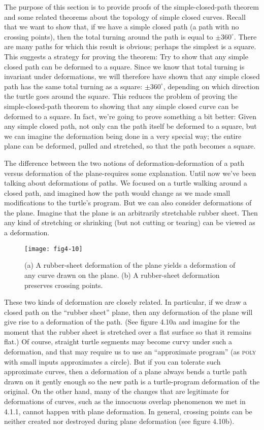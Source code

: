 \documentclass{book}
\begin{document}
The purpose of this section is to provide proofs of the simple-closed-path
theorem and some related theorems about the topology of simple closed
curves. Recall that we want to show that, if we have a simple closed
path (a path with no crossing points), then the total turning around the
path is equal to $\pm 360^{\circ}$. There are many paths for which this result
is obvious; perhaps the simplest is a square. This suggests a strategy
for proving the theorem: Try to show that any simple closed path can
be deformed to a square. Since we know that total turning is invariant
under deformations, we will therefore have shown that any simple closed
path has the same total turning as a square: $\pm 360^{\circ}$, depending on which
direction the turtle goes around the square. This reduces the problem
of proving the simple-closed-path theorem to showing that any simple
closed curve can be deformed to a square. In fact, we're going to prove
something a bit better: Given any simple closed path, not only can the
path itself be deformed to a square, but we can imagine the deformation
being done in a very special way; the entire plane can be deformed,
pulled and stretched, so that the path becomes a square.

The difference between the two notions of deformation-deformation
of a path versus deformation of the plane-requires some explanation.
Until now we've been talking about deformations of paths. We focused
on a turtle walking around a closed path, and imagined how the path
would change as we made small modifications to the turtle's program.
But we can also consider deformations of the plane. Imagine that the
plane is an arbitrarily stretchable rubber sheet. Then any kind of
stretching or shrinking (but not cutting or tearing) can be viewed as
a deformation.

\begin{figure}
\begin{center}
\texttt{[image: fig4-10]}
\caption{(a) A rubber-sheet deformation of the plane yields a deformation of any curve drawn on the plane. (b) A rubber-sheet deformation preserves crossing points.}
\end{center}
\end{figure}

These two kinds of deformation are closely related. In particular, if we
draw a closed path on the ``rubber sheet'' plane, then any deformation
of the plane will give rise to a deformation of the path. (See figure
4.10a and imagine for the moment that the rubber sheet is stretched
over a flat surface so that it remains flat.) Of course, straight turtle
segments may become curvy under such a deformation, and that may
require us to use an ``approximate program'' (as \textsc{poly} with small inputs
approximates a circle). But if you can tolerate such approximate curves,
then a deformation of a plane always bends a turtle path drawn on it
gently enough so the new path is a turtle-program deformation of the
original. On the other hand, many of the changes that are legitimate for
deformations of curves, such as the innocuous overlap phenomenon we
met in 4.1.1, cannot happen with plane deformation. In general, crossing
points can be neither created nor destroyed during plane deformation
(see figure 4.10b).
\end{document}
